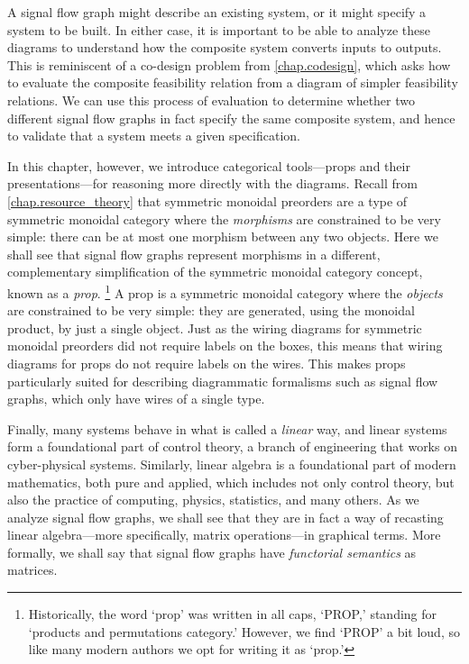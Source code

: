 \documentclass[7Sketches]{subfiles}
\begin{document}
A signal flow graph might describe an existing system, or it might specify a
system to be built. In either case, it is important to be able to analyze these
diagrams to understand how the composite system converts inputs to outputs.
This is reminiscent of a co-design problem from \cref{chap.codesign}, which asks
how to evaluate the composite feasibility relation from a diagram of simpler feasibility
relations. We can use this process of evaluation to determine whether two
different signal flow graphs in fact specify the same composite system, and
hence to validate that a system meets a given specification. 

In this chapter, however, we introduce categorical tools---props and
their presentations---for reasoning more directly with the diagrams. Recall from
\cref{chap.resource_theory} that symmetric monoidal preorders are a type of
symmetric monoidal category where the \emph{morphisms} are constrained to be
very simple: there can be at most one morphism between any two objects. Here we
shall see that signal flow graphs represent morphisms in a different,
complementary simplification of the symmetric monoidal category concept, known as a \emph{prop}.%
\footnote{
Historically, the word `prop' was written in all caps, `PROP,' standing for `products and permutations category.' However, we find `PROP' a bit loud, so like many modern authors we opt for writing it as `prop.'
}
A prop is a symmetric monoidal category where the \emph{objects} are constrained
to be very simple: they are generated, using the monoidal product, by just a
single object. Just as the wiring diagrams for symmetric monoidal preorders did
not require labels on the boxes, this means that wiring diagrams for props do
not require labels on the wires. This makes props particularly suited for
describing diagrammatic formalisms such as signal flow graphs, which only have
wires of a single type.

Finally, many systems behave in what is called a \emph{linear} way, and linear systems form a foundational part of control theory, a branch of engineering that works on cyber-physical systems. Similarly, linear
algebra is a foundational part of modern mathematics, both pure and applied,
which includes not only control theory, but also the practice of computing,
physics, statistics, and many others. As we analyze signal flow graphs, we shall see that they are in fact a
way of recasting linear algebra---more specifically, matrix operations---in graphical terms. More formally, we shall say
that signal flow graphs have \emph{functorial semantics} as matrices. %
\end{document}
